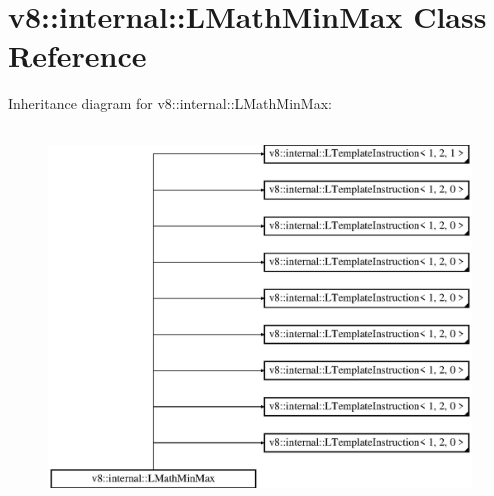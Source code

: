 \hypertarget{classv8_1_1internal_1_1_l_math_min_max}{}\section{v8\+:\+:internal\+:\+:L\+Math\+Min\+Max Class Reference}
\label{classv8_1_1internal_1_1_l_math_min_max}
Inheritance diagram for v8\+:\+:internal\+:\+:L\+Math\+Min\+Max\+:\begin{figure}[H]
\begin{center}
\leavevmode
\includegraphics[height=10.000000cm]{classv8_1_1internal_1_1_l_math_min_max}
\end{center}
\end{figure}
